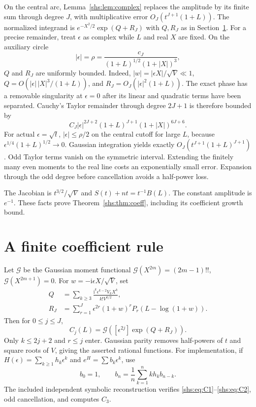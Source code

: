 \documentclass[11pt]{article}
\newcommand{\ii}{\mathrm{i}}
\newcommand{\E}{\mathcal{G}}
\theoremstyle{definition}
\theoremstyle{plain}
\begin{document}
On the central arc, Lemma~\ref{shs:lem:complex} replaces the amplitude by its
finite sum through degree $J$, with multiplicative error
$O_J(t^{J+1}(1+L))$. The normalized integrand is
$e^{-X^2/2}\exp(Q+R_J)$ with $Q,R_J$ as in Section~\ref{shs:sec:rule}.
For a precise remainder, treat $\epsilon$ as complex while $L$ and real
$X$ are fixed. On the auxiliary circle
\[
 |\epsilon|=\rho=\frac{c_J}{(1+L)^{1/2}(1+|X|)^3},
\]
$Q$ and $R_J$ are uniformly bounded. Indeed,
$|w|=|\epsilon X|/\sqrt V\ll1$,
$Q=O(|\epsilon|\,|X|^3/(1+L))$, and
$R_J=O_J(|\epsilon|^2(1+L))$.
The exact phase has a removable singularity at $\epsilon=0$ after its
linear and quadratic terms have been separated. Cauchy's Taylor
remainder through degree $2J+1$ is therefore bounded by
\[
 C_J|\epsilon|^{2J+2}(1+L)^{J+1}(1+|X|)^{6J+6}.
\]
For actual $\epsilon=\sqrt t$, $|\epsilon|\le\rho/2$ on the central
cutoff for large $L$, because $\epsilon^{1/4}(1+L)^{1/2}\to0$.
Gaussian integration yields exactly
$O_J(t^{J+1}(1+L)^{J+1})$.
Odd Taylor terms vanish on the symmetric interval. Extending the
finitely many even moments to the real line costs an exponentially
small error. Expansion through the odd degree before cancellation
avoids a half-power loss.

The Jacobian is $t^{3/2}/\sqrt V$ and $S(t)+nt=t^{-1}B(L)$.
The constant amplitude is $e^{-1}$. These facts prove
Theorem~\ref{shs:thm:coeff}, including its coefficient growth bound.

\section{A finite coefficient rule}\label{shs:sec:rule}
Let $\E$ be the Gaussian moment functional
$\E(X^{2m})=(2m-1)!!$, $\E(X^{2m+1})=0$.
For $w=-\ii\epsilon X/\sqrt V$, set
\begin{align*}
 Q&=\sum_{k\ge3}\frac{\ii^k\epsilon^{k-2}V_kX^k}{k!V^{k/2}},\\
 R_J&=\sum_{r=1}^{J}\epsilon^{2r}(1+w)^rP_r(L-\log(1+w)).
\end{align*}
Then for $0\le j\le J$,
\begin{equation}\label{shs:eq:rule}
 C_j(L)=\E\left([\epsilon^{2j}]\exp(Q+R_J)\right).
\end{equation}
Only $k\le2j+2$ and $r\le j$ enter. Gaussian parity removes half-powers
of $t$ and square roots of $V$, giving the asserted rational functions.
For implementation, if $H(\epsilon)=\sum_{k\ge1}h_k\epsilon^k$ and
$e^H=\sum b_k\epsilon^k$, use
\[
 b_0=1,\qquad b_n=\frac1n\sum_{k=1}^{n}k h_kb_{n-k}.
\]
The included independent symbolic reconstruction verifies
\eqref{shs:eq:C1}--\eqref{shs:eq:C2}, odd cancellation, and computes $C_3$.
\end{document}
